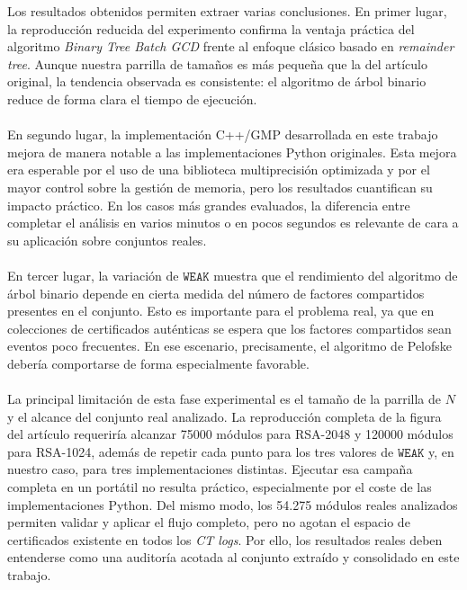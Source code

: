 Los resultados obtenidos permiten extraer varias conclusiones. En primer lugar, la reproducción reducida del experimento confirma la ventaja práctica del algoritmo \textit{Binary Tree Batch GCD} frente al enfoque clásico basado en \textit{remainder tree}. Aunque nuestra parrilla de tamaños es más pequeña que la del artículo original, la tendencia observada es consistente: el algoritmo de árbol binario reduce de forma clara el tiempo de ejecución.
\\
\\
En segundo lugar, la implementación C++/GMP desarrollada en este trabajo mejora de manera notable a las implementaciones Python originales. Esta mejora era esperable por el uso de una biblioteca multiprecisión optimizada y por el mayor control sobre la gestión de memoria, pero los resultados cuantifican su impacto práctico. En los casos más grandes evaluados, la diferencia entre completar el análisis en varios minutos o en pocos segundos es relevante de cara a su aplicación sobre conjuntos reales.
\\
\\
En tercer lugar, la variación de \(\texttt{WEAK}\) muestra que el rendimiento del algoritmo de árbol binario depende en cierta medida del número de factores compartidos presentes en el conjunto. Esto es importante para el problema real, ya que en colecciones de certificados auténticas se espera que los factores compartidos sean eventos poco frecuentes. En ese escenario, precisamente, el algoritmo de Pelofske debería comportarse de forma especialmente favorable.
\\
\\
La principal limitación de esta fase experimental es el tamaño de la parrilla de \(N\) y el alcance del conjunto real analizado. La reproducción completa de la figura del artículo requeriría alcanzar 75000 módulos para RSA-2048 y 120000 módulos para RSA-1024, además de repetir cada punto para los tres valores de \(\texttt{WEAK}\) y, en nuestro caso, para tres implementaciones distintas. Ejecutar esa campaña completa en un portátil no resulta práctico, especialmente por el coste de las implementaciones Python. Del mismo modo, los 54.275 módulos reales analizados permiten validar y aplicar el flujo completo, pero no agotan el espacio de certificados existente en todos los \textit{CT logs}. Por ello, los resultados reales deben entenderse como una auditoría acotada al conjunto extraído y consolidado en este trabajo.
